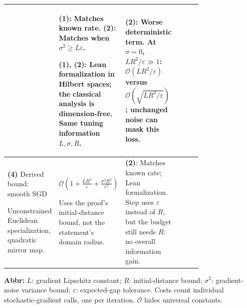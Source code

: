 \begin{table}[tp]
\begin{threeparttable}
\begin{tabularx}{\linewidth}{@{}>{\raggedright\arraybackslash}p{0.20\linewidth}>{\raggedright\arraybackslash}p{0.32\linewidth}>{\raggedright\arraybackslash}p{0.25\linewidth}>{\raggedright\arraybackslash}X@{}}
& \textbf{(1)}: Matches known rate. \textbf{(2)}: Matches when $\sigma^2\ge L\varepsilon$.
\par \textbf{(1)}, \textbf{(2)}: Lean formalization in Hilbert spaces; the classical analysis is dimension-free. Same tuning information $L,\sigma,R$.
& \textbf{(2)}: Worse deterministic term. At $\sigma=0$, $LR^2/\varepsilon\gg1$: $\mathcal{O}(LR^2/\varepsilon)$ versus $\mathcal{O}(\sqrt{LR^2/\varepsilon})$; unchanged noise can mask this loss. \\
\midrule
\textbf{(4)} Derived bound: smooth SGD \citep[Thm.~6.3 and proof]{qfsBubeck2015}
\par Unconstrained Euclidean specialization, quadratic mirror map.
& $\mathcal{O}\!\left(1+\frac{LR^2}{\varepsilon}+\frac{\sigma^2R^2}{\varepsilon^2}\right)$
\par Uses the proof's initial-distance bound, not the statement's domain radius.
& \textbf{(2)}: Matches known rate; Lean formalization. Step uses $\varepsilon$ instead of $R$, but the budget still needs $R$: no overall information gain.
& \\
\bottomrule
\end{tabularx}
\begin{tablenotes}[flushleft]\footnotesize
\item[] \textbf{Abbr:} $L$: gradient Lipschitz constant; $R$: initial-distance bound; $\sigma^2$: gradient-noise variance bound; $\varepsilon$: expected-gap tolerance. Costs count individual stochastic-gradient calls, one per iteration. $\mathcal{O}$ hides universal constants.
\end{tablenotes}
\end{threeparttable}
\end{table}
\clearpage
